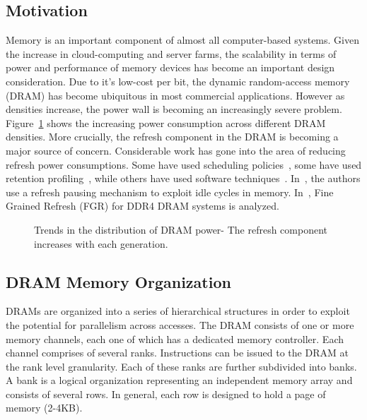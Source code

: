 \subsection{Motivation}
Memory is an important component of almost all computer-based systems. Given the increase in cloud-computing and server farms, the scalability in terms of power and performance of memory devices has become an important design consideration. Due to it's low-cost per bit, the dynamic random-access memory (DRAM) has become ubiquitous in most commercial applications. However as densities increase, the power wall is becoming an increasingly severe problem. Figure~\ref{fig:refreshTrends} shows the increasing power consumption across different DRAM densities. More crucially, the refresh component in the DRAM is becoming a major source of concern. 
Considerable work has gone into the area of reducing refresh power consumptions. Some have used scheduling policies~\cite{Stuecheli2010}, some have used retention profiling~\cite{Liu2012}, while others have used software techniques~\cite{Liu2012}. In~\cite{Nair2013}, the authors use a refresh pausing mechanism to exploit idle cycles in memory. In~\cite{Mukundan2013}, Fine Grained Refresh (FGR) for DDR4 DRAM systems is analyzed.  

\begin{figure}[ht!]
\centering
{}
\caption{\label{fig:refreshTrends} Trends in the distribution of DRAM power- The refresh component increases with each generation.}
\end{figure}

\subsection{DRAM Memory Organization}

DRAMs are organized into a series of hierarchical structures in order to exploit the potential for parallelism across accesses. The DRAM consists of one or more memory channels, each one of which has a dedicated memory controller. Each channel comprises of several ranks. Instructions can be issued to the DRAM at the rank level granularity. Each of these ranks are further subdivided into banks. A bank is a logical organization representing an independent memory array and consists of several rows. In general, each row is designed to hold a page of memory (2-4KB).

